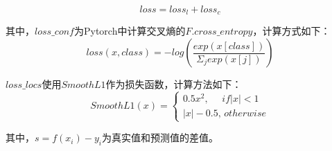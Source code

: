\begin{equation}
	loss = loss_l + loss_c
\end{equation}

其中，$loss\_conf$为Pytorch中计算交叉熵的$F.cross\_entropy$，计算方式如下：
\begin{equation}
	loss(x,class)=-log(\frac{exp(x[class])}{\Sigma_jexp(x[j])})
\end{equation}

$loss\_locs$使用$Smooth L1$作为损失函数，计算方法如下：
\begin{equation}
	Smooth L1(x)=\left\{\begin{matrix}
	0.5x^2,\,\,\,\,\,\,\,\,if |x|<1\\ 
	|x|-0.5,\,otherwise
	\end{matrix}\right.
\end{equation}

其中，$s=f(x_i)-y_i$为真实值和预测值的差值。
